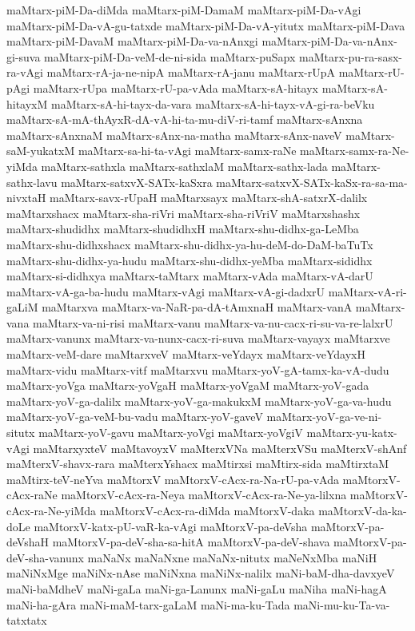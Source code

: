 {maMtarx-piM-Da-diMda
maMtarx-piM-DamaM
maMtarx-piM-Da-vAgi
maMtarx-piM-Da-vA-gu-tatxde
maMtarx-piM-Da-vA-yitutx
maMtarx-piM-Dava
maMtarx-piM-DavaM
maMtarx-piM-Da-va-nAnxgi
maMtarx-piM-Da-va-nAnx-gi-suva
maMtarx-piM-Da-veM-de-ni-sida
maMtarx-puSapx
maMtarx-pu-ra-sasx-ra-vAgi
maMtarx-rA-ja-ne-nipA
maMtarx-rA-janu
maMtarx-rUpA
maMtarx-rU-pAgi
maMtarx-rUpa
maMtarx-rU-pa-vAda
maMtarx-sA-hitayx
maMtarx-sA-hitayxM
maMtarx-sA-hi-tayx-da-vara
maMtarx-sA-hi-tayx-vA-gi-ra-beVku
maMtarx-sA-mA-thAyxR-dA-vA-hi-ta-mu-diV-ri-tamf
maMtarx-sAnxna
maMtarx-sAnxnaM
maMtarx-sAnx-na-matha
maMtarx-sAnx-naveV
maMtarx-saM-yukatxM
maMtarx-sa-hi-ta-vAgi
maMtarx-samx-raNe
maMtarx-samx-ra-Ne-yiMda
maMtarx-sathxla
maMtarx-sathxlaM
maMtarx-sathx-lada
maMtarx-sathx-lavu
maMtarx-satxvX-SATx-kaSxra
maMtarx-satxvX-SATx-kaSx-ra-sa-ma-nivxtaH
maMtarx-savx-rUpaH
maMtarxsayx
maMtarx-shA-satxrX-dalilx
maMtarxshacx
maMtarx-sha-riVri
maMtarx-sha-riVriV
maMtarxshashx
maMtarx-shudidhx
maMtarx-shudidhxH
maMtarx-shu-didhx-ga-LeMba
maMtarx-shu-didhxshacx
maMtarx-shu-didhx-ya-hu-deM-do-DaM-baTuTx
maMtarx-shu-didhx-ya-hudu
maMtarx-shu-didhx-yeMba
maMtarx-sididhx
maMtarx-si-didhxya
maMtarx-taMtarx
maMtarx-vAda
maMtarx-vA-darU
maMtarx-vA-ga-ba-hudu
maMtarx-vAgi
maMtarx-vA-gi-dadxrU
maMtarx-vA-ri-gaLiM
maMtarxva
maMtarx-va-NaR-pa-dA-tAmxnaH
maMtarx-vanA
maMtarx-vana
maMtarx-va-ni-risi
maMtarx-vanu
maMtarx-va-nu-cacx-ri-su-va-re-lalxrU
maMtarx-vanunx
maMtarx-va-nunx-cacx-ri-suva
maMtarx-vayayx
maMtarxve
maMtarx-veM-dare
maMtarxveV
maMtarx-veYdayx
maMtarx-veYdayxH
maMtarx-vidu
maMtarx-vitf
maMtarxvu
maMtarx-yoV-gA-tamx-ka-vA-dudu
maMtarx-yoVga
maMtarx-yoVgaH
maMtarx-yoVgaM
maMtarx-yoV-gada
maMtarx-yoV-ga-dalilx
maMtarx-yoV-ga-makukxM
maMtarx-yoV-ga-va-hudu
maMtarx-yoV-ga-veM-bu-vadu
maMtarx-yoV-gaveV
maMtarx-yoV-ga-ve-ni-situtx
maMtarx-yoV-gavu
maMtarx-yoVgi
maMtarx-yoVgiV
maMtarx-yu-katx-vAgi
maMtarxyxteV
maMtavoyxV
maMterxVNa
maMterxVSu
maMterxV-shAnf
maMterxV-shavx-rara
maMterxYshacx
maMtirxsi
maMtirx-sida
maMtirxtaM
maMtirx-teV-neYva
maMtorxV
maMtorxV-cAcx-ra-Na-rU-pa-vAda
maMtorxV-cAcx-raNe
maMtorxV-cAcx-ra-Neya
maMtorxV-cAcx-ra-Ne-ya-lilxna
maMtorxV-cAcx-ra-Ne-yiMda
maMtorxV-cAcx-ra-diMda
maMtorxV-daka
maMtorxV-da-ka-doLe
maMtorxV-katx-pU-vaR-ka-vAgi
maMtorxV-pa-deVsha
maMtorxV-pa-deVshaH
maMtorxV-pa-deV-sha-sa-hitA
maMtorxV-pa-deV-shava
maMtorxV-pa-deV-sha-vanunx
maNaNx
maNaNxne
maNaNx-nitutx
maNeNxMba
maNiH
maNiNxMge
maNiNx-nAse
maNiNxna
maNiNx-nalilx
maNi-baM-dha-davxyeV
maNi-baMdheV
maNi-gaLa
maNi-ga-Lanunx
maNi-gaLu
maNiha
maNi-hagA
maNi-ha-gAra
maNi-maM-tarx-gaLaM
maNi-ma-ku-Tada
maNi-mu-ku-Ta-va-tatxtatx
}
